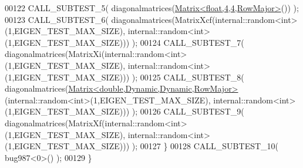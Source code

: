 \begin{DoxyCode}
00122     CALL\_SUBTEST\_5( diagonalmatrices(\hyperlink{group___core___module_class_eigen_1_1_matrix}{Matrix<float,4,4,RowMajor>}()) );
00123     CALL\_SUBTEST\_6( diagonalmatrices(MatrixXcf(internal::random<int>(1,EIGEN\_TEST\_MAX\_SIZE), 
      internal::random<int>(1,EIGEN\_TEST\_MAX\_SIZE))) );
00124     CALL\_SUBTEST\_7( diagonalmatrices(MatrixXi(internal::random<int>(1,EIGEN\_TEST\_MAX\_SIZE), 
      internal::random<int>(1,EIGEN\_TEST\_MAX\_SIZE))) );
00125     CALL\_SUBTEST\_8( diagonalmatrices(\hyperlink{group___core___module_class_eigen_1_1_matrix}{Matrix<double,Dynamic,Dynamic,RowMajor>}
      (internal::random<int>(1,EIGEN\_TEST\_MAX\_SIZE), internal::random<int>(1,EIGEN\_TEST\_MAX\_SIZE))) );
00126     CALL\_SUBTEST\_9( diagonalmatrices(MatrixXf(internal::random<int>(1,EIGEN\_TEST\_MAX\_SIZE), 
      internal::random<int>(1,EIGEN\_TEST\_MAX\_SIZE))) );
00127   \}
00128   CALL\_SUBTEST\_10( bug987<0>() );
00129 \}
\end{DoxyCode}
